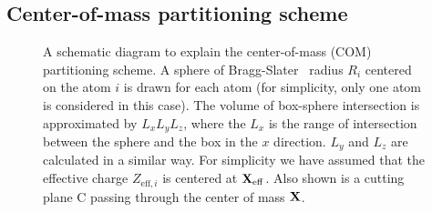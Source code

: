 \documentclass[preprint]{revtex4}
\begin{document}
\subsection{Center-of-mass partitioning scheme}
\label{subsec:COM}
\begin{figure}[t]
\caption{ A schematic diagram to explain the center-of-mass (COM)
partitioning scheme.  A sphere of Bragg-Slater~\cite{Slater_64v41}
radius $R_i$ centered on the atom $i$ is drawn for each atom (for
simplicity, only one atom is considered in this case).  The volume of
box-sphere intersection is approximated by $L_x L_y L_z$, where the
$L_x$ is the range of intersection between the sphere and the box in
the $x$ direction. $L_y$ and $L_z$ are calculated in a similar
way. For simplicity we have assumed that the effective charge
$Z_{\mathrm{eff},i}$ is centered at ${\bf X}_{\mathrm{eff}}$. Also
shown is a cutting plane C passing through the center of mass ${\bf
X}$.  }\label{fig:COM}
\end{figure}
\end{document}
